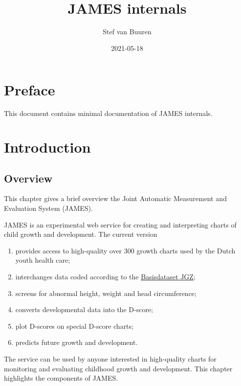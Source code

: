 \documentclass[
]{book}
\title{JAMES internals}
\author{Stef van Buuren}
\date{2021-05-18}
\providecommand{\tightlist}{%
  \setlength{\itemsep}{0pt}\setlength{\parskip}{0pt}}
\begin{document}
\maketitle

{
\setcounter{tocdepth}{1}
\tableofcontents
}
\hypertarget{preface}{%
\chapter*{Preface}\label{preface}}

This document contains minimal documentation of JAMES internals.

\hypertarget{intro}{%
\chapter{Introduction}\label{intro}}

\hypertarget{overview}{%
\section{Overview}\label{overview}}

This chapter gives a brief overview the Joint Automatic Measurement and Evaluation System (JAMES).

JAMES is an experimental web service for creating and interpreting charts of child growth and
development. The current version

\begin{enumerate}
\def\labelenumi{\arabic{enumi}.}
\tightlist
\item
  provides access to high-quality over 300 growth charts used by the Dutch youth health care;
\item
  interchanges data coded according to the \href{https://www.ncj.nl/themadossiers/informatisering/basisdataset/documentatie/?cat=13}{Basisdataset JGZ};
\item
  screens for abnormal height, weight and head circumference;
\item
  converts developmental data into the D-score;
\item
  plot D-scores on special D-score charts;
\item
  predicts future growth and development.
\end{enumerate}

The service can be used by anyone interested in high-quality charts for monitoring and evaluating childhood growth and development. This chapter highlights the components of JAMES.
\end{document}
